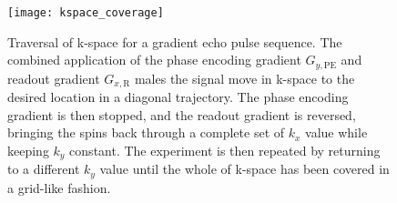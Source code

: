 \begin{figure}[!ht]
    \centering
    \texttt{[image: kspace\_coverage]}
    \caption{Traversal of k-space for a gradient echo pulse sequence. The combined application of the phase encoding gradient $G_{y,\text{PE}}$ and readout gradient $G_{x,\text{R}}$ males the signal move in k-space to the desired location in a diagonal trajectory. The phase encoding gradient is then stopped, and the readout gradient is reversed, bringing the spins back through a complete set of $k_x$ value while keeping $k_y$ constant. The experiment is then repeated by returning to a different $k_y$ value until the whole of k-space has been covered in a grid-like fashion.}\label{fig:kspace_coverage}
\end{figure}










